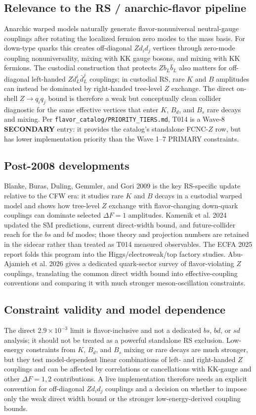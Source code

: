 \subsection*{Relevance to the RS / anarchic-flavor pipeline}
Anarchic warped models naturally generate flavor-nonuniversal neutral-gauge
couplings after rotating the localized fermion zero modes to the mass basis.
For down-type quarks this creates off-diagonal \(Z d_i d_j\) vertices through
zero-mode coupling nonuniversality, mixing with KK gauge bosons, and mixing
with KK fermions.  The custodial construction that protects \(Zb_L\bar b_L\)
also matters for off-diagonal left-handed \(Z d_L^i\bar d_L^j\) couplings;
in custodial RS, rare \(K\) and \(B\) amplitudes can instead be dominated by
right-handed tree-level \(Z\) exchange.  The direct on-shell \(Z\to q_iq_j\)
bound is therefore a weak but conceptually clean collider diagnostic for the
same effective vertices that enter \(K\), \(B_d\), and \(B_s\) rare decays and
mixing.  Per \texttt{flavor\_catalog/PRIORITY\_TIERS.md}, T014 is a Wave-8
\textbf{SECONDARY} entry: it provides the catalog's standalone FCNC-\(Z\)
row, but has lower implementation priority than the Wave 1--7 PRIMARY
constraints.

\subsection*{Post-2008 developments}
Blanke, Buras, Duling, Gemmler, and Gori 2009 is the key RS-specific update
relative to the CFW era: it studies rare \(K\) and \(B\) decays in a custodial
warped model and shows how tree-level \(Z\) exchange with flavor-changing
down-quark couplings can dominate selected \(\Delta F=1\) amplitudes.  Kamenik
et al. 2024 updated the SM predictions, current direct-width bound, and
future-collider reach for the \(bs\) and \(bd\) modes; those theory and
projection numbers are retained in the sidecar rather than treated as T014
measured observables.  The ECFA 2025 report folds this program into the
Higgs/electroweak/top factory studies.  Abu-Ajamieh et al. 2026 gives a
dedicated quark-sector survey of flavor-violating \(Z\) couplings, translating
the common direct width bound into effective-coupling conventions and comparing
it with much stronger meson-oscillation constraints.

\subsection*{Constraint validity and model dependence}
The direct \(2.9\times10^{-3}\) limit is flavor-inclusive and not a dedicated
\(bs\), \(bd\), or \(sd\) analysis; it should not be treated as a powerful
standalone RS exclusion.  Low-energy constraints from \(K\), \(B_d\), and
\(B_s\) mixing or rare decays are much stronger, but they test model-dependent
linear combinations of left- and right-handed \(Z\) couplings and can be
affected by correlations or cancellations with KK-gauge and other
\(\Delta F=1,2\) contributions.  A live implementation therefore needs an
explicit convention for off-diagonal \(Z d_i d_j\) couplings and a decision on
whether to impose only the weak direct width bound or the stronger
low-energy-derived coupling bounds.

